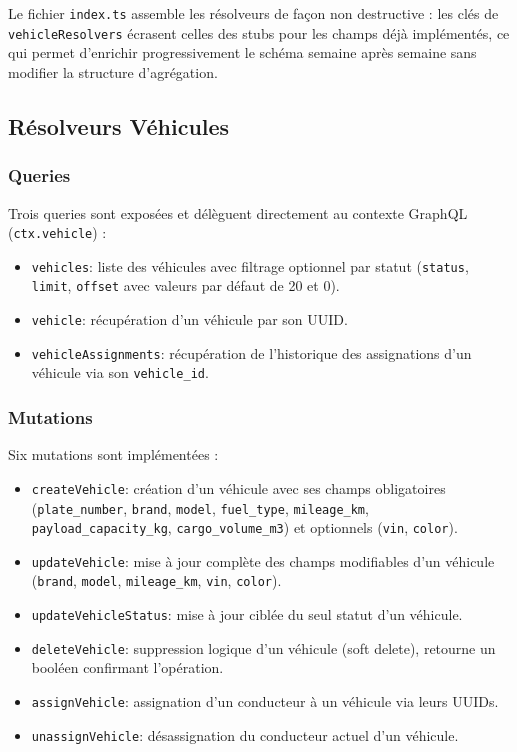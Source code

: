 \documentclass[12pt,a4paper]{article}
\begin{document}
\vspace{0.3cm}
Le fichier \texttt{index.ts} assemble les résolveurs de façon non destructive :
les clés de \texttt{vehicleResolvers} écrasent celles des stubs pour les champs
déjà implémentés, ce qui permet d'enrichir progressivement le schéma semaine
après semaine sans modifier la structure d'agrégation.

\newpage

\subsection{Résolveurs Véhicules}

\subsubsection*{Queries}

Trois queries sont exposées et délèguent directement au contexte GraphQL
(\texttt{ctx.vehicle}) :

\begin{itemize}
  \item \texttt{vehicles}: liste des véhicules avec filtrage optionnel
        par statut (\texttt{status}, \texttt{limit}, \texttt{offset} avec valeurs
        par défaut de 20 et 0).
  \item \texttt{vehicle}: récupération d'un véhicule par son UUID.
  \item \texttt{vehicleAssignments}: récupération de l'historique des assignations
        d'un véhicule via son \texttt{vehicle\_id}.
\end{itemize}

\subsubsection*{Mutations}

Six mutations sont implémentées :

\begin{itemize}
  \item \texttt{createVehicle}: création d'un véhicule avec ses champs obligatoires
        (\texttt{plate\_number}, \texttt{brand}, \texttt{model}, \texttt{fuel\_type}, \texttt{mileage\_km}, \texttt{payload\_capacity\_kg}, \texttt{cargo\_volume\_m3}) et optionnels (\texttt{vin}, \texttt{color}).
  \item \texttt{updateVehicle}: mise à jour complète des champs modifiables d'un véhicule
        (\texttt{brand}, \texttt{model}, \texttt{mileage\_km}, \texttt{vin}, \texttt{color}).
  \item \texttt{updateVehicleStatus}: mise à jour ciblée du seul statut d'un véhicule.
  \item \texttt{deleteVehicle}: suppression logique d'un véhicule (soft delete),
        retourne un booléen confirmant l'opération.
  \item \texttt{assignVehicle}: assignation d'un conducteur à un véhicule via leurs UUIDs.
  \item \texttt{unassignVehicle}: désassignation du conducteur actuel d'un véhicule.
\end{itemize}
\end{document}

